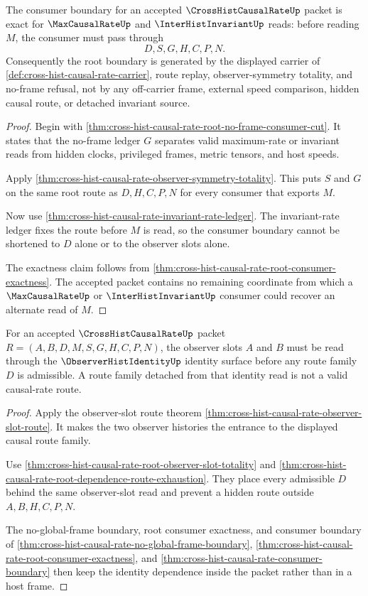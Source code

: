 \begin{theorem}
\label{thm:cross-hist-causal-rate-consumer-boundary}
The consumer boundary for an accepted $\CrossHistCausalRateUp$ packet is exact for $\MaxCausalRateUp$ and $\InterHistInvariantUp$ reads: before reading $M$, the consumer must pass through
$$
D,S,G,H,C,P,N.
$$
Consequently the root boundary is generated by the displayed carrier of \autoref{def:cross-hist-causal-rate-carrier}, route replay, observer-symmetry totality, and no-frame refusal, not by any off-carrier frame, external speed comparison, hidden causal route, or detached invariant source.
\end{theorem}
\begin{proof}
Begin with \autoref{thm:cross-hist-causal-rate-root-no-frame-consumer-cut}. It states that the no-frame ledger $G$ separates valid maximum-rate or invariant reads from hidden clocks, privileged frames, metric tensors, and host speeds.

Apply \autoref{thm:cross-hist-causal-rate-observer-symmetry-totality}. This puts $S$ and $G$ on the same root route as $D,H,C,P,N$ for every consumer that exports $M$.

Now use \autoref{thm:cross-hist-causal-rate-invariant-rate-ledger}. The invariant-rate ledger fixes the route before $M$ is read, so the consumer boundary cannot be shortened to $D$ alone or to the observer slots alone.

The exactness claim follows from \autoref{thm:cross-hist-causal-rate-root-consumer-exactness}. The accepted packet contains no remaining coordinate from which a $\MaxCausalRateUp$ or $\InterHistInvariantUp$ consumer could recover an alternate read of $M$.
\end{proof}

\begin{theorem}
\label{thm:cross-hist-causal-rate-observer-identity-dependence}
For an accepted $\CrossHistCausalRateUp$ packet $R=(A,B,D,M,S,G,H,C,P,N)$, the observer slots $A$ and $B$ must be read through the $\ObserverHistIdentityUp$ identity surface before any route family $D$ is admissible. A route family detached from that identity read is not a valid causal-rate route.
\end{theorem}
\begin{proof}
Apply the observer-slot route theorem \autoref{thm:cross-hist-causal-rate-observer-slot-route}. It makes the two observer histories the entrance to the displayed causal route family.

Use \autoref{thm:cross-hist-causal-rate-root-observer-slot-totality} and \autoref{thm:cross-hist-causal-rate-root-dependence-route-exhaustion}. They place every admissible $D$ behind the same observer-slot read and prevent a hidden route outside $A,B,H,C,P,N$.

The no-global-frame boundary, root consumer exactness, and consumer boundary of \autoref{thm:cross-hist-causal-rate-no-global-frame-boundary}, \autoref{thm:cross-hist-causal-rate-root-consumer-exactness}, and \autoref{thm:cross-hist-causal-rate-consumer-boundary} then keep the identity dependence inside the packet rather than in a host frame.
\end{proof}

